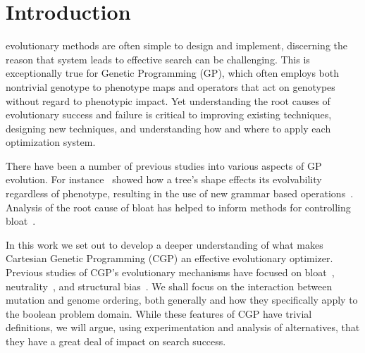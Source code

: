\documentclass[journal]{IEEEtran}
\begin{document}
%
\IEEEpeerreviewmaketitle



\section{Introduction}
% 
% 
% 
% 
 evolutionary methods are often simple to design
and implement, discerning the reason that system
leads to effective search can be challenging.
This is exceptionally
true for Genetic Programming (GP), which often employs both nontrivial
genotype to phenotype maps and operators that act on genotypes without regard to
phenotypic impact.  Yet understanding the root causes of evolutionary success
and failure is critical to improving existing techniques, designing new techniques,
and understanding how and where to apply each optimization system.

There have been a number of previous studies into various aspects of GP evolution.
For instance~\cite{daida3:2003:treebias} showed how a tree's shape effects its evolvability
regardless of phenotype,
resulting in the use of new grammar based operations~\cite{xuan:2006:grammar}.
Analysis of the root cause of bloat has helped to inform methods for controlling
bloat~\cite{luke:2006:bloat}.

In this work we set out to develop a deeper understanding of what makes Cartesian
Genetic Programming (CGP) an effective evolutionary optimizer.
Previous studies of CGP's evolutionary mechanisms have
focused on bloat~\cite{miller:2001:bloat},
neutrality~\cite{vassilev:2000:neutrality}, and structural bias~\cite{payne:2009:bias}.
We shall focus on the interaction between mutation and genome ordering, both
generally and how they specifically apply to the boolean problem domain.
While these features of CGP have trivial definitions, we will argue, using
experimentation and analysis of alternatives, that they have a great deal
of impact on search success.
\end{document}
